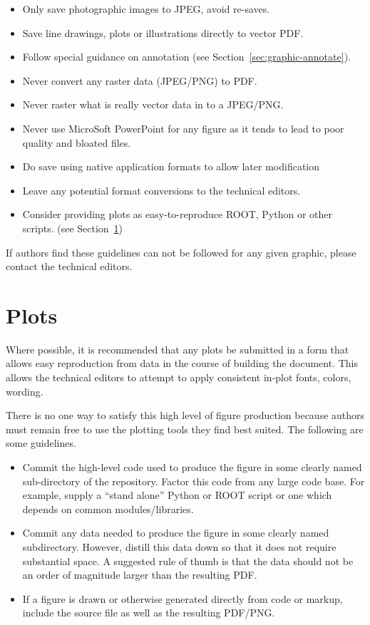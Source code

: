 \begin{itemize}
\item Only save photographic images to JPEG, avoid re-saves.
\item Save line drawings, plots or illustrations directly to vector PDF.
\item Follow special guidance on annotation (see Section~\ref{sec:graphic-annotate}).
\item Never convert any raster data (JPEG/PNG) to PDF.
\item Never raster what is really vector data in to a JPEG/PNG.
\item Never use MicroSoft PowerPoint for any figure as it tends to lead to poor quality and bloated files.
\item Do save using native application formats to allow later
  modification
\item Leave any potential format conversions to the technical editors.
\item Consider providing plots as easy-to-reproduce ROOT, Python or
  other scripts.
  (see Section~\ref{sec:graphic-plots})
\end{itemize}

\noindent If authors find these guidelines can not be followed for any
given graphic, please contact the technical editors.   

\section{Plots}
\label{sec:graphic-plots}

Where possible, it is recommended that any plots be submitted in a
form that allows easy reproduction from data in the course of building
the document.
This allows the technical editors to attempt to apply consistent
in-plot fonts, colors, wording.

There is no one way to satisfy this high level of figure production
because authors must remain free to use the plotting tools they find
best suited.  The following are some guidelines.

\begin{itemize}
\item Commit the high-level code used to produce the figure in some
  clearly named sub-directory of the repository.  Factor this code
  from any large code base.  For example, supply a ``stand alone''
  Python or ROOT script or one which depends on common
  modules/libraries.
  
\item Commit any data needed to produce the figure in some clearly
  named subdirectory.  However, distill this data down so that it does
  not require substantial space.  A suggested rule of thumb is that
  the data should not be an order of magnitude larger than the
  resulting PDF.

\item If a figure is drawn or otherwise generated directly from code
  or markup, include the source file as well as the resulting PDF/PNG.

\end{itemize}

